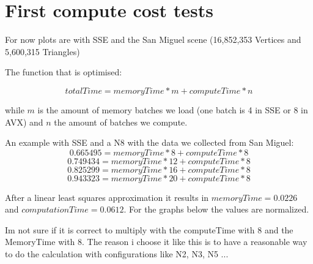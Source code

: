 
\section{First compute cost tests}

For now plots are with SSE and the San Miguel scene (16,852,353 Vertices and 5,600,315 Triangles) 

The function that is optimised: 

\[totalTime = memoryTime * m + computeTime * n \]

while $m$ is the amount of memory batches we load (one batch is 4 in SSE or 8 in AVX) and $n$ the amount of batches we compute.

An example with SSE and a N8 with the data we collected from San Miguel:
\[0.665495 = memoryTime * 8  + computeTime * 8 \]
\[0.749434 = memoryTime * 12 + computeTime * 8 \]
\[0.825299 = memoryTime * 16 + computeTime * 8 \]
\[0.943323 = memoryTime * 20 + computeTime * 8 \]

After a linear least squares approximation it results in $memoryTime = 0.0226$  and $computationTime = 0.0612$. For the graphs below the values are normalized.

Im not sure if it is correct to multiply with the computeTime with 8 and the MemoryTime with 8. The reason i choose it like this is to have a reasonable way to do the calculation with configurations like N2, N3, N5 ...

\newpage

\begin{minipage}[t]{0.8\textwidth}
\end{minipage}


